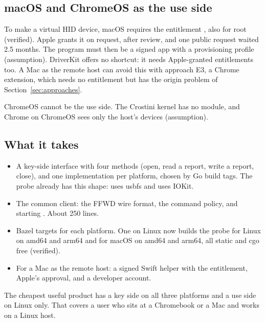 \subsection{macOS and ChromeOS as the use side}

To make a virtual HID device, macOS requires the entitlement
, also for root~\cite{iohidres}
(verified). Apple grants it on request, after review, and one public request
waited 2.5 months. The program must then be a signed app with a provisioning
profile (assumption). DriverKit offers no shortcut: it needs Apple-granted
entitlements too. A Mac as the remote host can avoid this with approach E3, a
Chrome extension, which needs no entitlement but has the origin problem of
Section~\ref{sec:approaches}.

ChromeOS cannot be the use side. The Crostini kernel has no 
module, and Chrome on ChromeOS sees only the host's devices (assumption).

\subsection{What it takes}

\begin{itemize}
\item A key-side interface with four methods (open, read a report, write a
      report, close), and one implementation per platform, chosen by Go
      build tags. The probe already has this shape: 
      uses usbfs and  uses IOKit.
\item The common client: the FFWD wire format, the command policy, and
      starting . About 250 lines.
\item Bazel targets for each platform. One  on Linux
      now builds the probe for Linux on amd64 and arm64 and for macOS on
      amd64 and arm64, all static and cgo free (verified).
\item For a Mac as the remote host: a signed Swift helper with the
      entitlement, Apple's approval, and a developer account.
\end{itemize}

The cheapest useful product has a key side on all three platforms and a use
side on Linux only. That covers a user who sits at a Chromebook or a Mac and
works on a Linux host.
